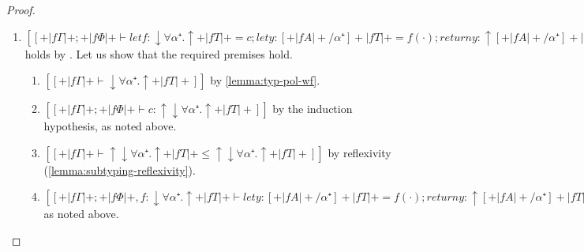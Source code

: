 \begin{proof}
\begin{caseof}
\begin{enumerate}
        \item $[[+|fΓ|+ ; +|fΦ|+  ⊢ let f : ↓∀α⁺.↑+|fT|+ = c; let y : [+|fA|+/α⁺]+|fT|+ = f(·); return y : ↑[+|fA|+/α⁺]+|fT|+]]$
          holds by . Let us show that the
          required premises hold.
          \begin{enumerate}
            \item $[[+|fΓ|+ ⊢ ↓∀α⁺.↑+|fT|+]]$ by \cref{lemma:typ-pol-wf}.
            \item $[[+|fΓ|+ ; +|fΦ|+ ⊢ c : ↑↓∀α⁺.↑+|fT|+]]$ by the induction hypothesis, as noted above.
            \item $[[+|fΓ|+  ⊢ ↑↓∀α⁺.↑+|fT|+ ≤ ↑↓∀α⁺.↑+|fT|+]]$ by reflexivity (\cref{lemma:subtyping-reflexivity}).
            \item $[[+|fΓ|+ ; +|fΦ|+, f : ↓∀α⁺.↑+|fT|+  ⊢ let y : [+|fA|+/α⁺]+|fT|+ = f(·); return y : ↑[+|fA|+/α⁺]+|fT|+]]$ as noted above.
          \end{enumerate}
      \end{enumerate}
  \end{caseof}
\end{proof}

